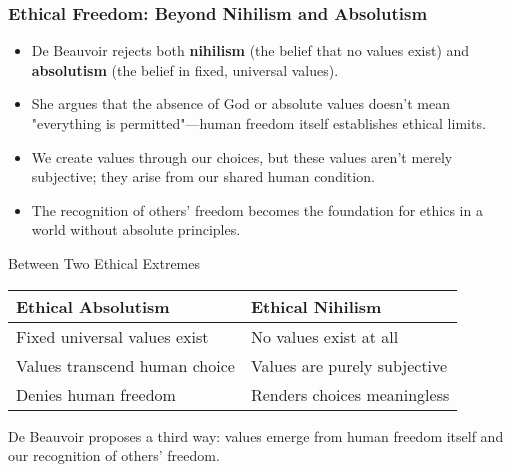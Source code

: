 \documentclass[aspectratio=169]{beamer}
\begin{document}
		\begin{frame}
			\frametitle{Ethical Freedom: Beyond Nihilism and Absolutism}
			\begin{itemize}
				\item De Beauvoir rejects both \textbf{nihilism} (the belief that no values exist) and \textbf{absolutism} (the belief in fixed, universal values).
				\item She argues that the absence of God or absolute values doesn't mean "everything is permitted"—human freedom itself establishes ethical limits.
				\item We create values through our choices, but these values aren't merely subjective; they arise from our shared human condition.
				\item The recognition of others' freedom becomes the foundation for ethics in a world without absolute principles.
			\end{itemize}
			
			\begin{block}{Between Two Ethical Extremes}
				\scriptsize
				\begin{tabular}{p{0.45\textwidth} | p{}}
					\textbf{Ethical Absolutism} & \textbf{Ethical Nihilism} \\
					\hline
					Fixed universal values exist & No values exist at all \\
					Values transcend human choice & Values are purely subjective \\
					Denies human freedom & Renders choices meaningless \\
				\end{tabular}
				
				\vspace{0.3cm}
				De Beauvoir proposes a third way: values emerge from human freedom itself and our recognition of others' freedom.
			\end{block}
		\end{frame}
		
\end{document}
